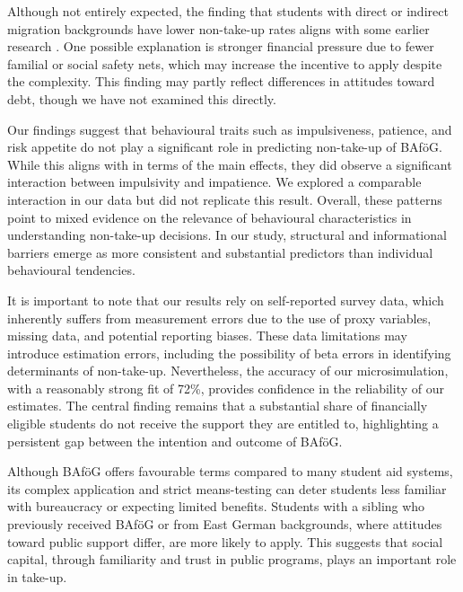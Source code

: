 Although not entirely expected, the finding that students with direct or indirect migration backgrounds have lower non-take-up rates aligns with some earlier research \citep{herber_non-take-up_2019, konijn_quantifying_2023}. 
One possible explanation is stronger financial pressure due to fewer familial or social safety nets, which may increase the incentive to apply despite the complexity.
This finding may partly reflect differences in attitudes toward debt, though we have not examined this directly. 


Our findings suggest that behavioural traits such as impulsiveness, patience, and risk appetite do not play a significant role in predicting non-take-up of BAföG. 
While this aligns with \cite{herber_non-take-up_2019} in terms of the main effects, they did observe a significant interaction between impulsivity and impatience. 
We explored a comparable interaction in our data but did not replicate this result.
Overall, these patterns point to mixed evidence on the relevance of behavioural characteristics in understanding non-take-up decisions. In our study, structural and informational barriers emerge as more consistent and substantial predictors than individual behavioural tendencies.

It is important to note that our results rely on self-reported survey data, which inherently suffers from measurement errors due to the use of proxy variables, missing data, and potential reporting biases. 
These data limitations may introduce estimation errors, including the possibility of beta errors in identifying determinants of non-take-up. 
Nevertheless, the accuracy of our microsimulation, with a reasonably strong fit of 72\%, provides confidence in the reliability of our estimates. 
The central finding remains that a substantial share of financially eligible students do not receive the support they are entitled to, highlighting a persistent gap between the intention and outcome of BAföG.

Although BAföG offers favourable terms compared to many student aid systems, its complex application and strict means-testing can deter students less familiar with bureaucracy or expecting limited benefits.
Students with a sibling who previously received BAföG or from East German backgrounds, where attitudes toward public support differ, are more likely to apply.
This suggests that social capital, through familiarity and trust in public programs, plays an important role in take-up.

